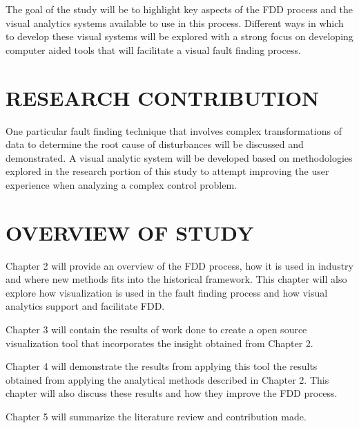 The goal of the study will be to highlight key aspects of the FDD process and the visual analytics systems available to use in this process. Different ways in which to develop these visual systems will be explored with a strong focus on developing computer aided tools that will facilitate a visual fault finding process.\par

\section{RESEARCH CONTRIBUTION}

One particular fault finding technique that involves complex transformations of data to determine the root cause of disturbances will be discussed and demonstrated. A visual analytic system will be developed based on methodologies explored in the research portion of this study to attempt improving the user experience when analyzing a complex control problem.\par

\section{OVERVIEW OF STUDY}

Chapter 2 will provide an overview of the FDD process, how it is used in industry and where new methods fits into the historical framework. This chapter will also explore how visualization is used in the fault finding process and how visual analytics support and facilitate FDD.\par
Chapter 3 will contain the results of work done to create a open source visualization tool that incorporates the insight obtained from Chapter 2.\par
Chapter 4 will demonstrate the results from applying this tool the results obtained from applying the analytical methods described in Chapter 2. This chapter will also discuss these results and how they improve the FDD process.\par
Chapter 5 will summarize the literature review and contribution made.\par



